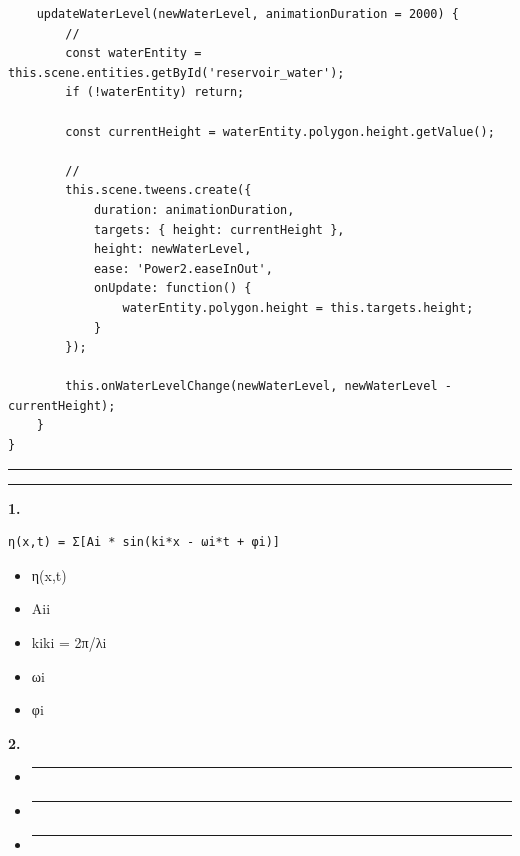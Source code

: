 \begin{verbatim}
    updateWaterLevel(newWaterLevel, animationDuration = 2000) {
        // 
        const waterEntity = this.scene.entities.getById('reservoir_water');
        if (!waterEntity) return;
        
        const currentHeight = waterEntity.polygon.height.getValue();
        
        // 
        this.scene.tweens.create({
            duration: animationDuration,
            targets: { height: currentHeight },
            height: newWaterLevel,
            ease: 'Power2.easeInOut',
            onUpdate: function() {
                waterEntity.polygon.height = this.targets.height;
            }
        });
        
        this.onWaterLevelChange(newWaterLevel, newWaterLevel - currentHeight);
    }
}
\end{verbatim}

\begin{center}\rule{0.5\linewidth}{0.5pt}\end{center}

\begin{center}\rule{0.5\linewidth}{0.5pt}\end{center}

\textbf{1. }

\begin{verbatim}
η(x,t) = Σ[Ai * sin(ki*x - ωi*t + φi)]
\end{verbatim}

\begin{itemize}
\tightlist
\item
  η(x,t)
\item
  Aii
\item
  kiki = 2π/λi
\item
  ωi
\item
  φi
\end{itemize}

\textbf{2. }

\begin{itemize}
\item
  \begin{center}\rule{0.5\linewidth}{0.5pt}\end{center}
\item
  \begin{center}\rule{0.5\linewidth}{0.5pt}\end{center}
\item
  \begin{center}\rule{0.5\linewidth}{0.5pt}\end{center}
\end{itemize}

